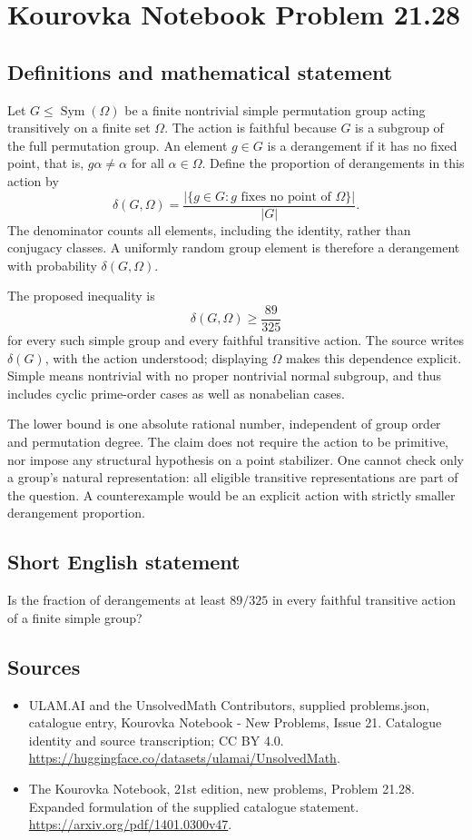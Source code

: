 \documentclass[11pt,a4paper]{article}
\begin{document}
\section*{Kourovka Notebook Problem 21.28}\label{statement}

\subsection{Definitions and mathematical statement}
Let $G\le\operatorname{Sym}(\Omega)$ be a finite nontrivial simple
permutation group acting transitively on a finite set $\Omega$.
The action is faithful because $G$ is a subgroup of the full permutation
group. An element $g\in G$ is a derangement if it has no fixed point,
that is, $g\alpha\ne\alpha$ for all $\alpha\in\Omega$.
Define the proportion of derangements in this action by
\[
 \delta(G,\Omega)=\frac{|\{g\in G:g\text{ fixes no point of }\Omega\}|}{|G|}.
\]
The denominator counts all elements, including the identity, rather than
conjugacy classes. A uniformly random group element is therefore a
derangement with probability $\delta(G,\Omega)$.

The proposed inequality is
\[
 \delta(G,\Omega)\ge\frac{89}{325}
\]
for every such simple group and every faithful transitive action.
The source writes $\delta(G)$, with the action understood; displaying
$\Omega$ makes this dependence explicit. Simple means nontrivial with
no proper nontrivial normal subgroup, and thus includes cyclic prime-order
cases as well as nonabelian cases.

The lower bound is one absolute rational number, independent of group
order and permutation degree. The claim does not require the action to
be primitive, nor impose any structural hypothesis on a point stabilizer.
One cannot check only a group's natural representation: all eligible
transitive representations are part of the question. A counterexample
would be an explicit action with strictly smaller derangement proportion.
\subsection{Short English statement}
Is the fraction of derangements at least $89/325$ in every faithful transitive action of a finite simple group?
\subsection{Sources}
\begin{itemize}
\item[S1] ULAM.AI and the UnsolvedMath Contributors, supplied problems.json, catalogue entry, Kourovka Notebook - New Problems, Issue 21. Catalogue identity and source transcription; CC BY 4.0.
\url{https://huggingface.co/datasets/ulamai/UnsolvedMath}.
\item[S2] The Kourovka Notebook, 21st edition, new problems, Problem 21.28. Expanded formulation of the supplied catalogue statement.
\url{https://arxiv.org/pdf/1401.0300v47}.
\end{itemize}
\end{document}
